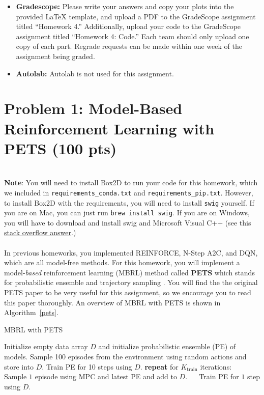 \documentclass[12pt]{article}
\begin{document}
\begin{itemize}
\begin{itemize}
\item \textbf{Gradescope:} Please write your answers and copy your plots into the provided LaTeX template, and upload a PDF to the GradeScope assignment titled ``Homework 4.'' Additionally, upload your code to the GradeScope assignment titled ``Homework 4: Code.'' Each team should only upload one copy of each part. Regrade requests can be made within one week of the assignment being graded.
\item \textbf{Autolab:} Autolab is not used for this assignment.

\end{itemize}
\end{itemize}

\newpage


\section*{Problem 1: Model-Based Reinforcement Learning with PETS (100 pts)}
\ \\
\textbf{Note}: You will need to install Box2D to run your code for this homework, which we included in \texttt{requirements\_conda.txt} and \texttt{requirements\_pip.txt}. However, to install Box2D with the requirements, you will need to install \texttt{swig} yourself. If you are on Mac, you can just run \texttt{brew install swig}. If you are on Windows, you will have to download and install swig and Microsoft Visual C++ (see this \href{https://stackoverflow.com/a/56277491}{stack overflow answer}.)
\\ \\
In previous homeworks, you implemented REINFORCE, N-Step A2C, and DQN, which are all model-free methods.  For this homework, you will implement a model-\textit{based} reinforcement learning (MBRL) method called \textbf{PETS} which stands for probabilistic ensemble and trajectory sampling \cite{chua2018deep}.  You will find the the original PETS paper to be very useful for this assignment, so we encourage you to read this paper thoroughly. An overview of MBRL with PETS is shown in Algorithm~\ref{pets}.

\begin{algorithm}
\label{alga2a}
\caption{MBRL with PETS\label{pets}}
\begin{algorithmic}[1]
\State Initialize empty data array $D$ and initialize probabilistic ensemble (PE) of models.
\State Sample 100 episodes from the environment using random actions and store into $D$. 
\State Train PE for 10 steps using $D$.
\State \textbf{repeat} for $K_{\text{train}}$ iterations:
\State $\quad$ Sample $1$ episode using MPC and latest PE and add to $D$.
\State $\quad$ Train PE for $1$ step using $D$.
\EndProcedure
\end{algorithmic}
\end{algorithm}
\end{document}
